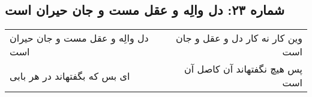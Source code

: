 \begin{center}
\section*{شماره ۲۳: دل والِه و عقل مست و جان حیران است}
\label{sec:023}
\begin{longtable}{l p{0.5cm} r}
دل والِه و عقل مست و جان حیران است
&&
وین کار نه کار دل و عقل و جان است
\\
ای بس که بگفتهاند در هر بابی
&&
پس هیچ نگفتهاند آن کاصل آن است
\\
\end{longtable}
\end{center}
